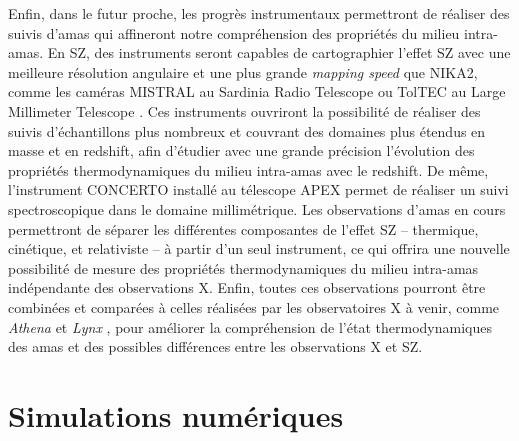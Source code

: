 Enfin, dans le futur proche, les progrès instrumentaux permettront de réaliser des suivis d'amas qui affineront notre compréhension des propriétés du milieu intra-amas.
En SZ, des instruments seront capables de cartographier l'effet SZ avec une meilleure résolution angulaire et une plus grande \textit{mapping speed} que NIKA2, comme les caméras MISTRAL au Sardinia Radio Telescope \cite{bolli_sardinia_2015} ou TolTEC au Large Millimeter Telescope \cite{wilson_toltec_2020}.
Ces instruments ouvriront la possibilité de réaliser des suivis d'échantillons plus nombreux et couvrant des domaines plus étendus en masse et en redshift, afin d'étudier avec une grande précision l'évolution des propriétés thermodynamiques du milieu intra-amas avec le redshift.
De même, l'instrument CONCERTO \cite{the_concerto_collaboration_wide_2020} installé au télescope APEX permet de réaliser un suivi spectroscopique dans le domaine millimétrique.
Les observations d'amas en cours permettront de séparer les différentes composantes de l'effet SZ -- thermique, cinétique, et relativiste -- à partir d'un seul instrument, ce qui offrira une nouvelle possibilité de mesure des propriétés thermodynamiques du milieu intra-amas indépendante des observations X.
Enfin, toutes ces observations pourront être combinées et comparées à celles réalisées par les observatoires X à venir, comme \textit{Athena} \cite{nandra_hot_2013, barret_athena_2020} et \textit{Lynx} \cite{the_lynx_team_lynx_2018}, pour améliorer la compréhension de l'état thermodynamiques des amas et des possibles différences entre les observations X et SZ.


\section*{Simulations numériques}

